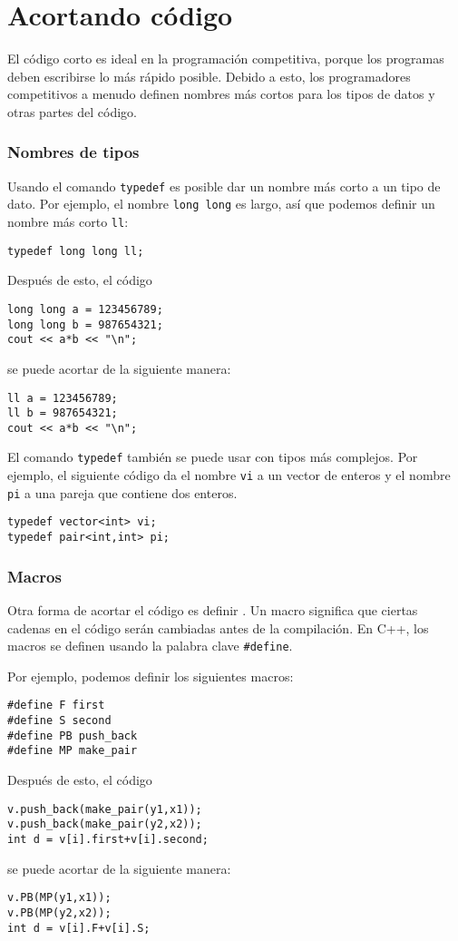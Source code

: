 \section{Acortando c\'odigo}

El c\'odigo corto es ideal en la programaci\'on competitiva,
porque los programas deben escribirse
lo m\'as r\'apido posible.
Debido a esto, los programadores competitivos a menudo definen
nombres m\'as cortos para los tipos de datos y otras partes del c\'odigo.

\subsubsection{Nombres de tipos}
Usando el comando \texttt{typedef}
es posible dar un nombre m\'as corto
a un tipo de dato.
Por ejemplo, el nombre \texttt{long long} es largo,
as\'i que podemos definir un nombre m\'as corto \texttt{ll}:
\begin{lstlisting}
typedef long long ll;
\end{lstlisting}
Despu\'es de esto, el c\'odigo
\begin{lstlisting}
long long a = 123456789;
long long b = 987654321;
cout << a*b << "\n";
\end{lstlisting}
se puede acortar de la siguiente manera:
\begin{lstlisting}
ll a = 123456789;
ll b = 987654321;
cout << a*b << "\n";
\end{lstlisting}

El comando \texttt{typedef}
tambi\'en se puede usar con tipos m\'as complejos.
Por ejemplo, el siguiente c\'odigo da
el nombre \texttt{vi} a un vector de enteros
y el nombre \texttt{pi} a una pareja
que contiene dos enteros.
\begin{lstlisting}
typedef vector<int> vi;
typedef pair<int,int> pi;
\end{lstlisting}

\subsubsection{Macros}
Otra forma de acortar el c\'odigo es definir
.
Un macro significa que ciertas cadenas en
el c\'odigo ser\'an cambiadas antes de la compilaci\'on.
En C++, los macros se definen usando la
palabra clave \texttt{\#define}.

Por ejemplo, podemos definir los siguientes macros:
\begin{lstlisting}
#define F first
#define S second
#define PB push_back
#define MP make_pair
\end{lstlisting}
Despu\'es de esto, el c\'odigo
\begin{lstlisting}
v.push_back(make_pair(y1,x1));
v.push_back(make_pair(y2,x2));
int d = v[i].first+v[i].second;
\end{lstlisting}
se puede acortar de la siguiente manera:
\begin{lstlisting}
v.PB(MP(y1,x1));
v.PB(MP(y2,x2));
int d = v[i].F+v[i].S;
\end{lstlisting}

